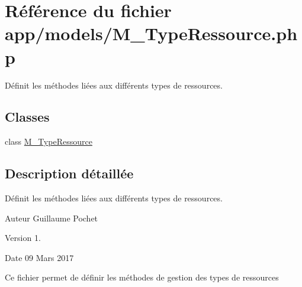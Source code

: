 \hypertarget{_m___type_ressource_8php}{}\section{Référence du fichier app/models/\+M\+\_\+\+Type\+Ressource.php}
\label{_m___type_ressource_8php}


Définit les méthodes liées aux différents types de ressources.  


\subsection*{Classes}
\begin{DoxyCompactItemize}
\item 
class \hyperlink{class_m___type_ressource}{M\+\_\+\+Type\+Ressource}
\end{DoxyCompactItemize}


\subsection{Description détaillée}
Définit les méthodes liées aux différents types de ressources. 

\begin{DoxyAuthor}{Auteur}
Guillaume Pochet 
\end{DoxyAuthor}
\begin{DoxyVersion}{Version}
1. 
\end{DoxyVersion}
\begin{DoxyDate}{Date}
09 Mars 2017
\end{DoxyDate}
Ce fichier permet de définir les méthodes de gestion des types de ressources 